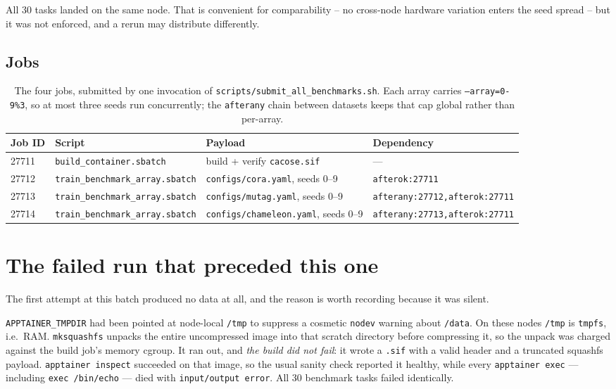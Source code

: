 \documentclass[11pt,a4paper]{article}
\begin{document}
All 30 tasks landed on the same node. That is convenient for comparability -- no cross-node
hardware variation enters the seed spread -- but it was not enforced, and a rerun may distribute
differently.

\subsection{Jobs}

\begin{table}[!htbp]
\centering
\begin{tabular}{llll}
\toprule
Job ID & Script & Payload & Dependency \\
\midrule
27711 & \texttt{build\_container.sbatch} & build + verify \texttt{cacose.sif} & --- \\
27712 & \texttt{train\_benchmark\_array.sbatch} & \texttt{configs/cora.yaml}, seeds 0--9 & \texttt{afterok:27711} \\
27713 & \texttt{train\_benchmark\_array.sbatch} & \texttt{configs/mutag.yaml}, seeds 0--9 & \texttt{afterany:27712,afterok:27711} \\
27714 & \texttt{train\_benchmark\_array.sbatch} & \texttt{configs/chameleon.yaml}, seeds 0--9 & \texttt{afterany:27713,afterok:27711} \\
\bottomrule
\end{tabular}
\caption{The four jobs, submitted by one invocation of \texttt{scripts/submit\_all\_benchmarks.sh}.
Each array carries \texttt{--array=0-9\%3}, so at most three seeds run concurrently; the
\texttt{afterany} chain between datasets keeps that cap global rather than per-array.}
\end{table}

\section{The failed run that preceded this one}

The first attempt at this batch produced no data at all, and the reason is worth recording because
it was silent.

\texttt{APPTAINER\_TMPDIR} had been pointed at node-local \texttt{/tmp} to suppress a cosmetic
\texttt{nodev} warning about \texttt{/data}. On these nodes \texttt{/tmp} is \texttt{tmpfs}, i.e.\
RAM. \texttt{mksquashfs} unpacks the entire uncompressed image into that scratch directory before
compressing it, so the unpack was charged against the build job's memory cgroup. It ran out, and
\emph{the build did not fail}: it wrote a \texttt{.sif} with a valid header and a truncated
squashfs payload. \texttt{apptainer inspect} succeeded on that image, so the usual sanity check
reported it healthy, while every \texttt{apptainer exec} --- including \texttt{exec /bin/echo} ---
died with \texttt{input/output error}. All 30 benchmark tasks failed identically.
\end{document}
